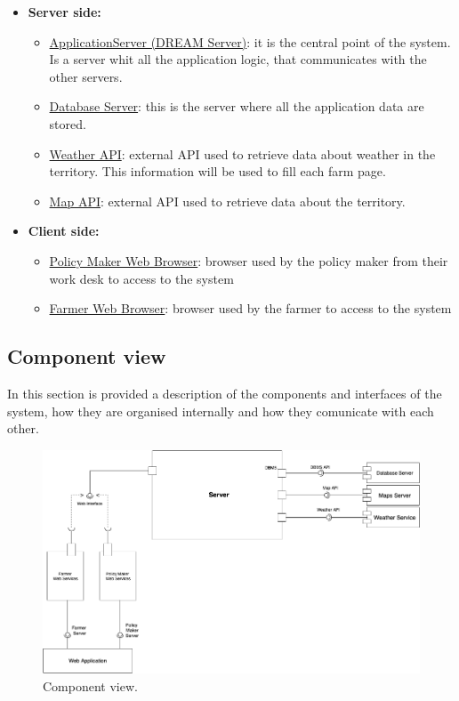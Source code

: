\begin{itemize}
    \item \textbf{Server side:}
        \begin{itemize}
            \item \underline{ApplicationServer (DREAM Server)}: it is the central point of the system. Is a server whit all the application logic, that communicates with the other servers. 
            \item \underline{Database Server}: this is the server where all the application data are stored.
            \item \underline{Weather API}: external API used to retrieve data about weather in the territory. This information will be used to fill each farm page.
            \item \underline{Map API}: external API used to retrieve data about the territory.
        \end{itemize}
    \item \textbf{Client side:}
        \begin{itemize}
            \item \underline{Policy Maker Web Browser}: browser used by the policy maker from their work desk to access to the system
            \item \underline{Farmer Web Browser}: browser used by the farmer to access to the system
        \end{itemize}
\end{itemize}


\subsection{Component view}

In this section is provided a description of the components and interfaces of the system, how they are organised internally and how they comunicate with each other.

\begin{figure}[H]
    \begin{center}
    \includegraphics[width=1.2\textwidth]{images/Component1.png}
    \caption{Component view.}
    \label{fig:component view}
    \end{center}
\end{figure}

